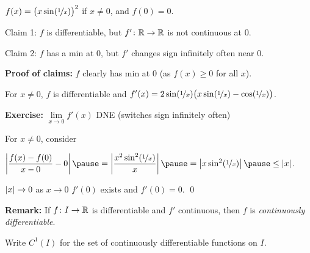 \documentclass[10pt,aspectratio=169]{beamer}
\begin{document}
\begin{frame}

$f(x) = {\bigl( x \sin(\nicefrac{1}{x}) \bigr)}^2$ if $x \not= 0$, and $f(0) = 0$.

\medskip

Claim 1: $f$ is differentiable, but $f' \colon {\mathbb{R}} \to {\mathbb{R}}$ is not continuous at
$0$.

\medskip

Claim 2: $f$ has a min at $0$, but $f'$
changes sign infinitely often near $0$.

\pause
\medskip

\textbf{Proof of claims:}
$f$ clearly has min at $0$ (as $f(x) \geq 0$ for all $x$).

\pause
\medskip

For $x \not= 0$,
$f$ is differentiable
and
$f'(x) = 2 \sin (\nicefrac{1}{x}) \bigl( x \sin (\nicefrac{1}{x}) -
\cos(\nicefrac{1}{x}) \bigr)$.

\pause
\medskip

\textbf{Exercise:} $\lim\limits_{x\to 0} f'(x)$ DNE (switches sign
infinitely often)

\pause
\medskip

For $x \neq 0$, consider

\medskip

\quad
$\displaystyle
\abs{\frac{f(x)-f(0)}{x-0} - 0}
\pause
=
\abs{\frac{x^2 \sin^2(\nicefrac{1}{x})}{x}}
\pause
=
\abs{x \sin^2(\nicefrac{1}{x})}
\pause
\leq
\abs{x}$.

\pause
\medskip

$\left\lvert {x} \right\rvert \to 0$ as $x \to 0$
\pause
\wthus $f'(0)$ exists and $f'(0) = 0$. \qed

\end{frame}

\begin{frame}

\textbf{Remark:}
If $f \colon I \to {\mathbb{R}}$ is differentiable and
$f'$ continuous, then $f$ is
\emph{continuously differentiable}.

\pause
\medskip

Write $C^1(I)$ for the set of continuously differentiable functions on $I$.

\end{frame}
\end{document}
